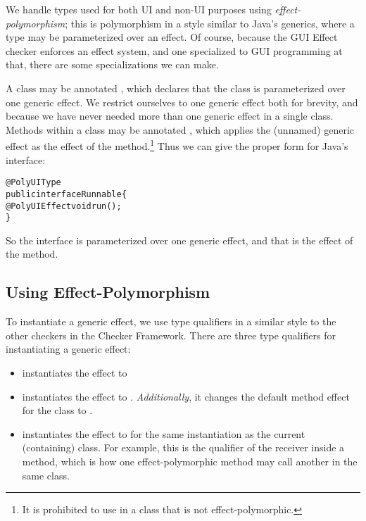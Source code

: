 We handle types used for both UI and non-UI purposes using \emph{effect-polymorphism}; this is
polymorphism in a style similar to Java's generics, where a type may be parameterized over an
effect.  Of course, because the GUI Effect checker enforces an effect system, and one specialized to
GUI programming at that, there are some specializations we can make.

A class may be annotated , which declares that the class is parameterized over one
generic effect.  We restrict ourselves to one generic effect both for brevity, and because we have
never needed more than one generic effect in a single class.  Methods within a 
class may be annotated , which applies the (unnamed) generic effect as the
effect of the method.\footnote{It is prohibited to use  in a class that is not
effect-polymorphic.}  Thus we can give the proper form for Java's  interface:

\begin{alltt}
@PolyUIType
public interface Runnable \{
    @PolyUIEffect void run();
\}
\end{alltt}

So the  interface is parameterized over one generic effect, and that is the effect of
the  method.

\subsection{Using Effect-Polymorphism}
To instantiate a generic effect, we use type qualifiers in a similar style to the other checkers in the Checker Framework.
There are three type qualifiers for instantiating a generic effect:
\begin{itemize}
\item {} instantiates the effect to 
\item {} instantiates the effect to .  \emph{Additionally}, it changes the
default method effect for the class to .
\item {} instantiates the effect to  for the same instantiation as
the current (containing) class.  For example, this is the qualifier of the receiver 
inside a  method, which is how one effect-polymorphic method may call another in
the same class.
\end{itemize}

